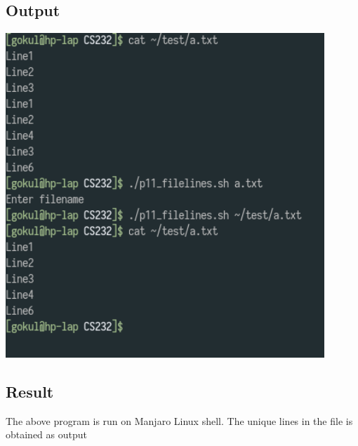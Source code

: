\documentclass{article}
\begin{document}
\subsection{Output}
\includegraphics[width=0.9\textwidth]{img/p15.png}\newline

\subsection{Result}
The above program is run on Manjaro Linux shell. The unique lines in the
file is obtained as output
\end{document}
